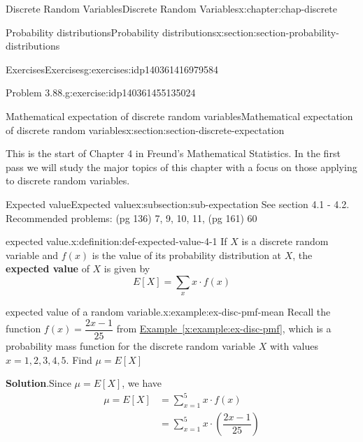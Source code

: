 \documentclass[oneside,10pt,]{book}
\newcommand{\blocktitlefont}{\relax}
\newcommand{\xreffont}{\relax}
\newcommand{\terminology}[1]{\textbf{#1}}
\numberwithin{equation}{section}
\newcommand{\amp}{&}
\begin{document}
\begin{chapterptx}{Discrete Random Variables}{}{Discrete Random Variables}{}{}{x:chapter:chap-discrete}
\begin{sectionptx}{Probability distributions}{}{Probability distributions}{}{}{x:section:section-probability-distributions}
\begin{exercises-subsection}{Exercises}{}{Exercises}{}{}{g:exercises:idp140361416979584}
\begin{divisionexercise}{8}{Problem 3.88.}{}{g:exercise:idp140361455135024}
\begin{enumerate}[label=(\alph*)]
\end{enumerate}
%
\end{divisionexercise}%
\end{exercises-subsection}
\end{sectionptx}
%
%
\typeout{************************************************}
\typeout{************************************************}
%
\begin{sectionptx}{Mathematical expectation of discrete random variables}{}{Mathematical expectation of discrete random variables}{}{}{x:section:section-discrete-expectation}
\begin{introduction}{}%
This is the start of Chapter 4 in Freund's Mathematical Statistics. In the first pass we will study the major topics of this chapter with a focus on those applying to discrete random variables.%
\end{introduction}%
%
%
\typeout{************************************************}
\typeout{************************************************}
%
\begin{subsectionptx}{Expected value}{}{Expected value}{}{}{x:subsection:sub-expectation}
See section 4.1 - 4.2. Recommended problems: (pg 136) 7, 9, 10, 11, (pg 161) 60%
\begin{definition}{expected value.}{x:definition:def-expected-value-4-1}%
If \(X\) is a discrete random variable and \(\displaystyle f(x)\) is the value of its probability distribution at \(X\), the \terminology{expected value} of \(X\) is given by%
\begin{equation*}
E[X] = \sum_x x\cdot f(x)
\end{equation*}
%
\end{definition}
\begin{example}{expected value of a random variable.}{x:example:ex-disc-pmf-mean}%
Recall the function \(f(x) = \dfrac{2x-1}{25}\) from \hyperref[x:example:ex-disc-pmf]{Example~{\xreffont\ref{x:example:ex-disc-pmf}}}, which is a probability mass function for the discrete random variable \(X\) with values \(x=1,2,3,4,5\).  Find \(\mu = E[X]\)%
\par\smallskip%
\noindent\textbf{\blocktitlefont Solution}.\hypertarget{g:solution:idp140361455144304}{}\quad{}Since \(\mu = E[X]\), we have%
\begin{align*}
\mu = E[X] \amp = \sum\limits_{x=1}^5 x\cdot f(x)\\
\amp = \sum\limits_{x=1}^5 x\cdot \left(\dfrac{2x-1}{25}\right)\\

\end{align*}
\end{example}
\end{subsectionptx}
\end{sectionptx}
\end{chapterptx}
\end{document}
